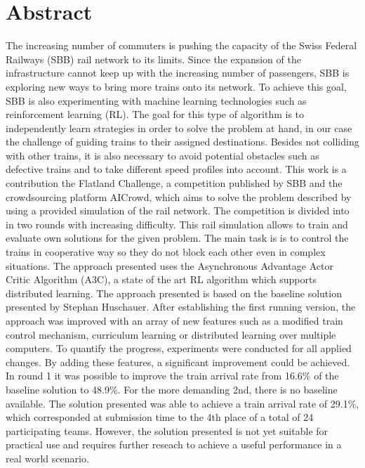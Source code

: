 \chapter*{Abstract}\label{abstract}
The increasing number of commuters is pushing the capacity of the Swiss Federal Railways (SBB) rail network to its limits. Since the expansion of the infrastructure cannot keep up with the increasing number of passengers, SBB is exploring new ways to bring more trains onto its network. To achieve this goal, SBB is also experimenting with machine learning technologies such as reinforcement learning (RL). 
The goal for this type of algorithm is to independently learn strategies  in order to solve the problem at hand, in our case the challenge of guiding trains to their assigned destinations. Besides not colliding with other trains, it is also necessary to avoid potential obstacles such as defective trains and to take different speed profiles into account. This work is a contribution the Flatland Challenge, a competition published by SBB and the crowdsourcing platform AICrowd, which aims to solve the problem described by using a provided simulation of the rail network. The competition is divided into in two rounds with increasing difficulty. This rail simulation allows to train and evaluate own solutions for the given problem. The main task is is to control the trains in cooperative way so they do not block each other even in complex situations. The approach presented uses the Asynchronous Advantage Actor Critic Algorithm (A3C), a state of the art RL algorithm which supports distributed learning. The approach presented is based on the baseline solution presented by Stephan Huschauer. After establishing the first running version, the approach was improved with an array of new features such as a modified train control mechanism, curriculum learning or distributed learning over multiple computers. To quantify the progress, experiments were conducted for all applied changes. By adding these features, a significant improvement could be achieved. In round 1 it was possible to improve the train arrival rate from 16.6\% of the baseline solution to 48.9\%.
For the more demanding 2nd, there is no baseline available. The solution presented was able to achieve a train arrival rate of 29.1\%, which corresponded at submission time to the 4th place of a total of 24 participating teams.
However, the solution presented is not yet suitable for practical use and requires further reseach to achieve a useful performance in a real world scenario.

